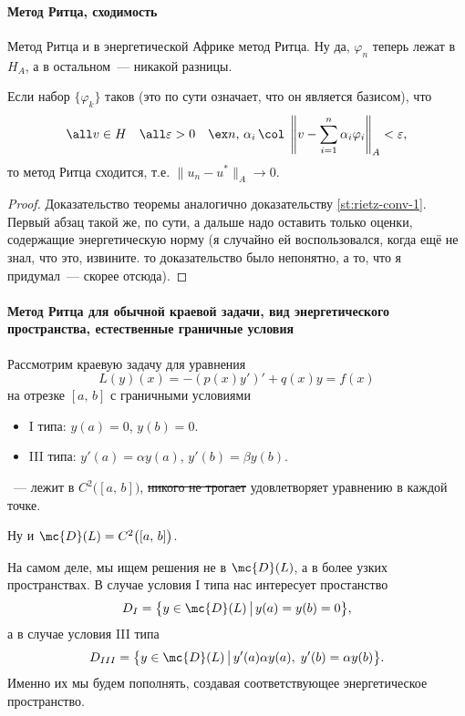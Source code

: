 \documentclass{trlnotes}
\begin{document}
    \paragraph{Метод Ритца, сходимость}

    Метод Ритца и в энергетической Африке метод Ритца. Ну да, $\varphi_n$ теперь лежат в $H_A$, а в остальном~--- никакой разницы.

    \begin{thm}
        Если набор $\{\varphi_k\}$ таков (это по сути означает, что он является базисом), что
        \[
            \all v \in H \quad \all \varepsilon > 0 \quad \ex n, \, \alpha_i \, \col \; \left\|v - \sum\limits_{i = 1}^n \alpha_i \varphi_i \right\|_A < \varepsilon,
        \]
        то метод Ритца сходится, т.е. $\|u_n - u^*\|_A \to 0$.
        \begin{proof}
            Доказательство теоремы аналогично доказательству \ref{st:rietz-conv-1}. Первый абзац такой же, по сути, а дальше надо оставить только оценки, содержащие энергетическую норму (я случайно ей воспользовался, когда ещё не знал, что это, извините. то доказательство было непонятно, а то, что я придумал~--- скорее отсюда).
        \end{proof}
    \end{thm}

    \paragraph{Метод Ритца для обычной краевой задачи, вид энергетического пространства, естественные граничные условия}

    Рассмотрим краевую задачу для уравнения 
    \[
        L(y)(x) = -(p(x)y')' + q(x)y = f(x)
    \]
    на отрезке $[a, \, b]$ с граничными условиями
    \begin{itemize}
        \item I типа: $y(a) = 0$, $y(b) = 0$.
        \item III типа: $y'(a) = \alpha y(a)$, $y'(b) = \beta y(b)$.
    \end{itemize}

    \begin{de}
        ~--- лежит в $C^2\big([a, \, b]\big)$, \sout{никого не трогает} удовлетворяет уравнению в каждой точке. 
    \end{de}

    Ну и $\mc{D}(L) = C^2\big([a, \, b]\big)$. 

    \begin{rem}
        На самом деле, мы ищем решения не в $\mc{D}(L)$, а в более узких пространствах. В случае условия I типа нас интересует простанство
        \[
            D_{I} = \big\{y \in \mc{D}(L) \, \big| \, y(a) = y(b) = 0\big\},
        \]
        а в случае условия III типа
        \[
            D_{III} = \big\{y \in \mc{D}(L) \, \big| \, y'(a)\alpha y(a), \; y'(b) = \alpha y(b)\big\}.
        \]
        Именно их мы будем пополнять, создавая соответствующее энергетическое пространство.
    \end{rem}
\end{document}
